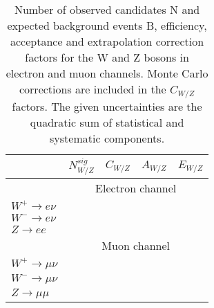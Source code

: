 \begin{table}[!tbp]
\begin{center}
\caption{Number of observed candidates N and expected background events B, efficiency, acceptance and extrapolation correction factors for the W and Z bosons in electron and muon channels. Monte Carlo corrections are included in the $C_{W/Z}$ factors. The given uncertainties are the quadratic sum of statistical and systematic components.}
\label{tab:Values}
\begin{tabular}{l | c c c c }
\hline
\hline
 & $N_{W/Z}^{sig}$ & $C_{W/Z}$ & $A_{W/Z}$ & $E_{W/Z}$ \\
 \hline
& \multicolumn{4}{c}{Electron channel}\\
 \hline
 $W^{+}\to e\nu$  & & & & \\
 $W^{-}\to e\nu$ & & & & \\
 $Z \to ee$ & & & & \\
 \hline
 & \multicolumn{4}{c}{Muon channel} \\
  \hline
  $W^{+}\to \mu\nu$  & & & & \\
 $W^{-}\to \mu\nu$ & & & & \\
 $Z \to \mu \mu $ & & & & \\
 \hline
\end{tabular}
\end{center}
\end{table}
